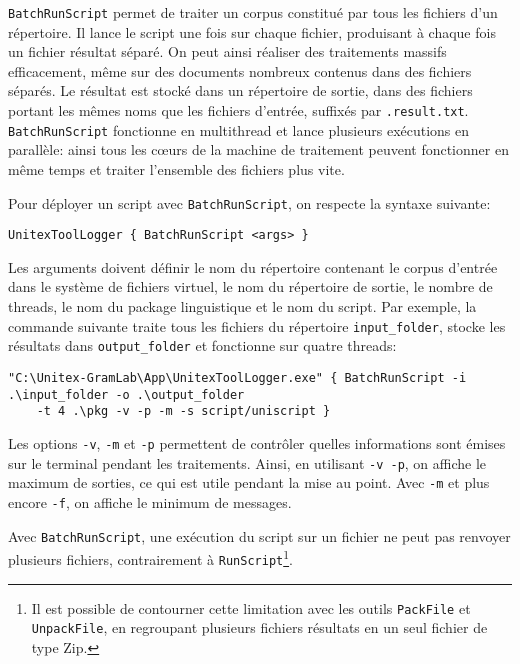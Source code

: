 \verb$BatchRunScript$ permet de traiter un corpus constitué par tous les fichiers d'un répertoire.
Il lance le script une fois sur chaque fichier, produisant à chaque fois un fichier résultat séparé.
On peut ainsi réaliser des traitements massifs efficacement, même sur des documents nombreux
contenus dans des fichiers séparés. Le résultat est stocké dans un répertoire de sortie, dans des
fichiers portant les mêmes noms que les fichiers d'entrée, suffixés par \verb$.result.txt$.
\verb$BatchRunScript$ fonctionne en multithread et lance plusieurs exécutions en parallèle: ainsi
tous les cœurs de la machine de traitement peuvent fonctionner en même temps et traiter
l’ensemble des fichiers plus vite.

\bigskip
\noindent Pour déployer un script avec \verb$BatchRunScript$, on respecte la syntaxe suivante:

\begin{verbatim}
UnitexToolLogger { BatchRunScript <args> }
\end{verbatim}

\noindent Les arguments doivent définir le nom du répertoire contenant le corpus d'entrée
dans le système de fichiers virtuel, le nom du répertoire de sortie, le nombre de threads, le nom
du package linguistique et le nom du script. Par exemple, la commande suivante traite tous les
fichiers du répertoire \verb$input_folder$, stocke les résultats dans \verb$output_folder$
et fonctionne sur quatre threads:

\begin{Verbatim}[fontsize=\small,fontfamily=helvetica]
"C:\Unitex-GramLab\App\UnitexToolLogger.exe" { BatchRunScript -i .\input_folder -o .\output_folder 
    -t 4 .\pkg -v -p -m -s script/uniscript }
\end{Verbatim}

\noindent Les options \verb$-v$, \verb$-m$ et \verb$-p$ permettent de contrôler quelles 
informations sont émises sur le terminal pendant les traitements. Ainsi, en utilisant \verb$-v -p$,
on affiche le maximum de sorties, ce qui est utile pendant la mise au point. Avec \verb$-m$
et plus encore \verb$-f$, on affiche le minimum de messages.

\bigskip
\noindent Avec \verb$BatchRunScript$, une exécution du script sur un fichier ne peut pas
renvoyer plusieurs fichiers, contrairement à \verb$RunScript$\footnote{Il est possible de
contourner cette limitation avec les outils \texttt{PackFile}  et \texttt{UnpackFile}, en
regroupant plusieurs fichiers résultats en un seul fichier de type Zip.}.



